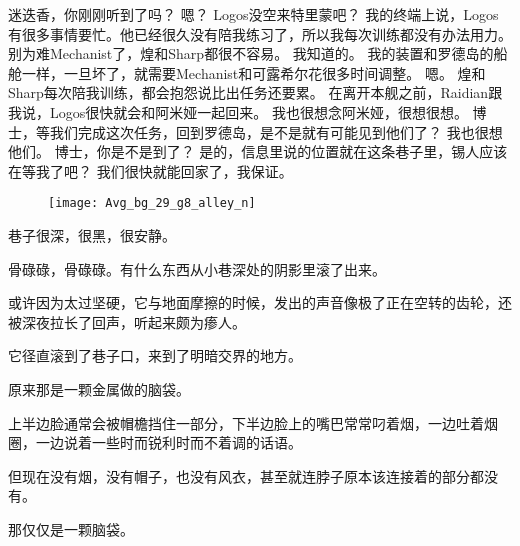 \documentclass[openany]{book}
\begin{document}
\begin{dialogue}
     迷迭香，你刚刚听到了吗？
     嗯？
     Logos没空来特里蒙吧？
     我的终端上说，Logos有很多事情要忙。他已经很久没有陪我练习了，所以我每次训练都没有办法用力。
     别为难Mechanist了，煌和Sharp都很不容易。
     我知道的。
     我的装置和罗德岛的船舱一样，一旦坏了，就需要Mechanist和可露希尔花很多时间调整。
     嗯。
     煌和Sharp每次陪我训练，都会抱怨说比出任务还要累。
     在离开本舰之前，Raidian跟我说，Logos很快就会和阿米娅一起回来。
     我也很想念阿米娅，很想很想。
     博士，等我们完成这次任务，回到罗德岛，是不是就有可能见到他们了？
     我也很想他们。
     博士，你是不是到了？
     是的，信息里说的位置就在这条巷子里，锡人应该在等我了吧？
     我们很快就能回家了，我保证。
\end{dialogue}\par

\begin{figure}[h]
    \centering
    \texttt{[image: Avg\_bg\_29\_g8\_alley\_n]}
\end{figure}
巷子很深，很黑，很安静。\par
骨碌碌，骨碌碌。有什么东西从小巷深处的阴影里滚了出来。\par
或许因为太过坚硬，它与地面摩擦的时候，发出的声音像极了正在空转的齿轮，还被深夜拉长了回声，听起来颇为瘆人。\par
它径直滚到了巷子口，来到了明暗交界的地方。\par
原来那是一颗金属做的脑袋。\par
上半边脸通常会被帽檐挡住一部分，下半边脸上的嘴巴常常叼着烟，一边吐着烟圈，一边说着一些时而锐利时而不着调的话语。\par
但现在没有烟，没有帽子，也没有风衣，甚至就连脖子原本该连接着的部分都没有。\par
那仅仅是一颗脑袋。
\end{document}
